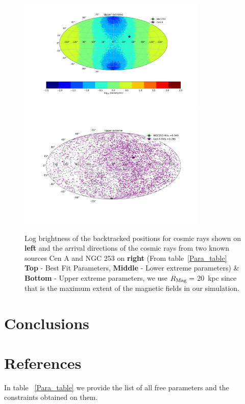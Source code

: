 \documentclass[12pt, a4 paper]{article}
\begin{document}
\begin{figure}[h!]
\includegraphics[width=9.0cm]{Images/Log_Bins_180_Historgam_UB_N2_Str_Tur_TM_40_EeV.png}
\includegraphics[width=9.0cm]{Images/Bins_180_UB_N2_CenA_NGC253_Str_Tur_TM_40_EeV.png}
\caption{Log brightness of the backtracked positions for cosmic rays shown on \textbf{left} and the arrival directions of the cosmic rays from two known sources Cen A and NGC 253 on \textbf{right} (From table~\ref{Para_table} \textbf{Top} - Best Fit Parameters, {\textbf{Middle} - Lower extreme parameters)} \& {\textbf{Bottom} - Upper extreme parameters, we use $R_{\rm Mag} = $ 20~kpc since that is the maximum extent of the magnetic fields in our simulation.}}
\label{fig:AD_Plots}
\end{figure}
\newpage
\section{Conclusions}
\label{Conclusions}

\clearpage
\section{References}

\printbibliography[heading=none]

\nocite{*}

In table ~\ref{Para_table} we provide the list of all free parameters and the constraints obtained on them.
\newline
\end{document}
